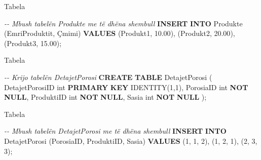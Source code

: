 \documentclass[
  ignorenonframetext,
]{beamer}
\newenvironment{Shaded}{\begin{snugshade}}{\end{snugshade}}
\newcommand{\CommentTok}[1]{\textcolor[rgb]{0.56,0.35,0.01}{\textit{#1}}}
\newcommand{\DataTypeTok}[1]{\textcolor[rgb]{0.13,0.29,0.53}{#1}}
\newcommand{\DecValTok}[1]{\textcolor[rgb]{0.00,0.00,0.81}{#1}}
\newcommand{\FloatTok}[1]{\textcolor[rgb]{0.00,0.00,0.81}{#1}}
\newcommand{\KeywordTok}[1]{\textcolor[rgb]{0.13,0.29,0.53}{\textbf{#1}}}
\newcommand{\NormalTok}[1]{#1}
\newcommand{\StringTok}[1]{\textcolor[rgb]{0.31,0.60,0.02}{#1}}
\begin{document}
\begin{frame}[fragile]{Tabela}
\label{tabela-7}
\begin{Shaded}
\begin{Highlighting}[]
\CommentTok{{-}{-} Mbush tabelën Produkte me të dhëna shembull}
\KeywordTok{INSERT} \KeywordTok{INTO}\NormalTok{ Produkte (EmriProduktit, Çmimi)}
\KeywordTok{VALUES} 
\NormalTok{(}\StringTok{\textquotesingle{}Produkt1\textquotesingle{}}\NormalTok{, }\FloatTok{10.00}\NormalTok{),}
\NormalTok{(}\StringTok{\textquotesingle{}Produkt2\textquotesingle{}}\NormalTok{, }\FloatTok{20.00}\NormalTok{),}
\NormalTok{(}\StringTok{\textquotesingle{}Produkt3\textquotesingle{}}\NormalTok{, }\FloatTok{15.00}\NormalTok{);}
\end{Highlighting}
\end{Shaded}
\end{frame}

\begin{frame}[fragile]{Tabela}
\label{tabela-8}
\begin{Shaded}
\begin{Highlighting}[]
\CommentTok{{-}{-} Krijo tabelën DetajetPorosi}
\KeywordTok{CREATE} \KeywordTok{TABLE}\NormalTok{ DetajetPorosi (}
\NormalTok{  DetajetPorosiID }\DataTypeTok{int} \KeywordTok{PRIMARY} \KeywordTok{KEY}\NormalTok{ IDENTITY(}\DecValTok{1}\NormalTok{,}\DecValTok{1}\NormalTok{),}
\NormalTok{  PorosiaID }\DataTypeTok{int} \KeywordTok{NOT} \KeywordTok{NULL}\NormalTok{,}
\NormalTok{  ProduktiID }\DataTypeTok{int} \KeywordTok{NOT} \KeywordTok{NULL}\NormalTok{,}
\NormalTok{  Sasia }\DataTypeTok{int} \KeywordTok{NOT} \KeywordTok{NULL}
\NormalTok{);}
\end{Highlighting}
\end{Shaded}
\end{frame}

\begin{frame}[fragile]{Tabela}
\label{tabela-9}
\begin{Shaded}
\begin{Highlighting}[]
\CommentTok{{-}{-} Mbush tabelën DetajetPorosi me të dhëna shembull}
\KeywordTok{INSERT} \KeywordTok{INTO}\NormalTok{ DetajetPorosi (PorosiaID, ProduktiID, Sasia)}
\KeywordTok{VALUES} 
\NormalTok{(}\DecValTok{1}\NormalTok{, }\DecValTok{1}\NormalTok{, }\DecValTok{2}\NormalTok{),}
\NormalTok{(}\DecValTok{1}\NormalTok{, }\DecValTok{2}\NormalTok{, }\DecValTok{1}\NormalTok{),}
\NormalTok{(}\DecValTok{2}\NormalTok{, }\DecValTok{3}\NormalTok{, }\DecValTok{3}\NormalTok{);}
\end{Highlighting}
\end{Shaded}
\end{frame}
\end{document}
